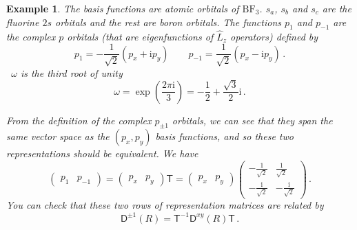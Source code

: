 \documentclass{article}
\theoremstyle{plain}\theoremheaderfont{\normalfont\itshape}\theorembodyfont{\rmfamily}\theoremseparator{.}\newtheorem*{rem}{Remark}\newtheorem*{ex}{Example}\newtheorem*{proof}{Proof}\newtheorem*{altp}{Alternative proof}
\theoremstyle{plain}\theoremheaderfont{\normalfont\bfseries}\theorembodyfont{\rmfamily}\theoremseparator{.}\newtheorem{thm}{Theorem}[section]\newtheorem{lem}[thm]{Lemma}\newtheorem{prop}[thm]{Proposition}\newtheorem*{cor}{Corollary}\newtheorem{defn}[thm]{Definition}\newtheorem{clm}[thm]{Claim}\newtheorem{clminproof}{Claim}\newtheorem*{law}{Law}\newtheorem{pos}[thm]{Postulate}
\theoremstyle{break}\theoremheaderfont{\normalfont\itshape}\theorembodyfont{\rmfamily}\theoremseparator{.\medskip}\newtheorem*{proofskip}{Proof}\newtheorem*{exs}{Examples}\newtheorem*{rems}{Remarks}
\theoremstyle{break}\theoremheaderfont{\normalfont\bfseries}\theorembodyfont{\rmfamily}\theoremseparator{.\medskip}\newtheorem{lemskip}[thm]{Lemma}\newtheorem{defnskip}[thm]{Definition}\newtheorem{propskip}[thm]{Proposition}\newtheorem{thmskip}[thm]{Theorem}
\numberwithin{equation}{section}
\newcommand{\ii}{\mathrm{i}}
\newcommand{\DD}{\mathsf{D}}
\newcommand{\TT}{\mathsf{T}}
\begin{document}
\begin{ex}
        The basis functions are atomic orbitals of \(\mathrm{BF_3}\). \(s_a\), \(s_b\) and \(s_c\) are the fluorine \(2s\) orbitals and the rest are boron orbitals. The functions \(p_{1}\) and \(p_{-1}\) are the complex \(p\) orbitals (that are eigenfunctions of \(\hat{L}_z\) operators) defined by
        \begin{equation}
            p_{1}=-\frac{1}{\sqrt{2}}(p_x+\ii p_y)\qquad p_{-1}=\frac{1}{\sqrt{2}}(p_x-\ii p_y)\,.
        \end{equation}\
        \(\omega\) is the third root of unity
        \begin{equation}
            \omega=\exp\left(\frac{2\pi \ii}{3}\right)=-\frac{1}{2}+\frac{\sqrt{3}}{2}\ii\,.
        \end{equation}

        From the definition of the complex \(p_{\pm 1}\) orbitals, we can see that they span the same vector space as the \((p_x,p_y)\) basis functions, and so these two representations should be equivalent. We have
        \begin{equation}
            \begin{pmatrix}
                p_1 & p_{-1}
            \end{pmatrix}=\begin{pmatrix}
                p_x & p_y
            \end{pmatrix}\TT=\begin{pmatrix}
                p_x & p_y
            \end{pmatrix}\begin{pmatrix}
                -\frac{1}{\sqrt{2}} & \frac{1}{\sqrt{2}} \\
                -\frac{\ii}{\sqrt{2}} & -\frac{\ii}{\sqrt{2}}
            \end{pmatrix}\,.
        \end{equation}
        You can check that these two rows of representation matrices are related by
        \begin{equation}
            \DD^{\pm 1}(R)=\TT^{-1}\DD^{xy}(R)\TT\,.
        \end{equation}
    \end{ex}
\end{document}
